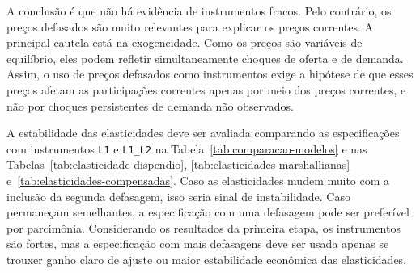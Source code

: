 A conclusão é que não há evidência de instrumentos fracos. Pelo contrário, os preços defasados são muito relevantes para explicar os preços correntes. A principal cautela está na exogeneidade. Como os preços são variáveis de equilíbrio, eles podem refletir simultaneamente choques de oferta e de demanda. Assim, o uso de preços defasados como instrumentos exige a hipótese de que esses preços afetam as participações correntes apenas por meio dos preços correntes, e não por choques persistentes de demanda não observados.

A estabilidade das elasticidades deve ser avaliada comparando as especificações com instrumentos \texttt{L1} e \texttt{L1\_L2} na Tabela~\ref{tab:comparacao-modelos} e nas Tabelas~\ref{tab:elasticidade-dispendio}, \ref{tab:elasticidades-marshallianas} e~\ref{tab:elasticidades-compensadas}. Caso as elasticidades mudem muito com a inclusão da segunda defasagem, isso seria sinal de instabilidade. Caso permaneçam semelhantes, a especificação com uma defasagem pode ser preferível por parcimônia. Considerando os resultados da primeira etapa, os instrumentos são fortes, mas a especificação com mais defasagens deve ser usada apenas se trouxer ganho claro de ajuste ou maior estabilidade econômica das elasticidades.

